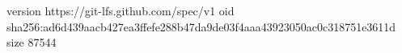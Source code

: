 version https://git-lfs.github.com/spec/v1
oid sha256:ad6d439aacb427ea3ffefe288b47da9de03f4aaa43923050ac0c318751e3611d
size 87544
